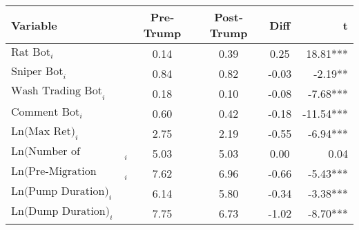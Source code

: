 \begin{tabular}{lcccr}
\toprule
Variable & Pre-Trump & Post-Trump & Diff & t \\
\midrule
$\text{Rat Bot}_{i}$ & 0.14 & 0.39 & 0.25 & 18.81*** \\
$\text{Sniper Bot}_{i}$ & 0.84 & 0.82 & -0.03 & -2.19** \\
$\text{Wash Trading Bot}_{i}$ & 0.18 & 0.10 & -0.08 & -7.68*** \\
$\text{Comment Bot}_{i}$ & 0.60 & 0.42 & -0.18 & -11.54*** \\
$\text{Ln(Max Ret)}_{i}$ & 2.75 & 2.19 & -0.55 & -6.94*** \\
$\text{Ln(Number of Traders)}_{i}$ & 5.03 & 5.03 & 0.00 & 0.04 \\
$\text{Ln(Pre-Migration Duration)}_{i}$ & 7.62 & 6.96 & -0.66 & -5.43*** \\
$\text{Ln(Pump Duration)}_{i}$ & 6.14 & 5.80 & -0.34 & -3.38*** \\
$\text{Ln(Dump Duration)}_{i}$ & 7.75 & 6.73 & -1.02 & -8.70*** \\
\bottomrule
\end{tabular}